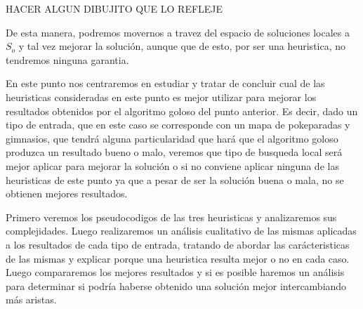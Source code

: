 HACER ALGUN DIBUJITO QUE LO REFLEJE
 
De esta manera, podremos movernos a travez del espacio de soluciones locales a $S_o$ y tal vez mejorar la solución, aunque que de esto, por ser una heuristica, no tendremos ninguna garantia.

En este punto nos centraremos en estudiar y tratar de concluir cual de las heuristicas consideradas en este punto es mejor utilizar para mejorar los resultados obtenidos por el algoritmo goloso del punto anterior. Es decir, dado un tipo de entrada, que en este caso se corresponde con un mapa de pokeparadas y gimnasios, que tendrá alguna particularidad que hará que el algoritmo goloso produzca un resultado bueno o malo, veremos que tipo de busqueda local será mejor aplicar para mejorar la solución o si no conviene aplicar ninguna de las heuristicas de este punto ya que a pesar de ser la solución buena o mala, no se obtienen mejores resultados.

Primero veremos los pseudocodigos de las tres heuristicas y analizaremos sus complejidades. Luego realizaremos un análisis cualitativo de las mismas aplicadas a los resultados de cada tipo de entrada, tratando de abordar las carácteristicas de las mismas y explicar porque una heuristica resulta mejor o no en cada caso. Luego compararemos los mejores resultados y si es posible haremos un análisis para determinar si podría haberse obtenido una solución mejor intercambiando más aristas.
